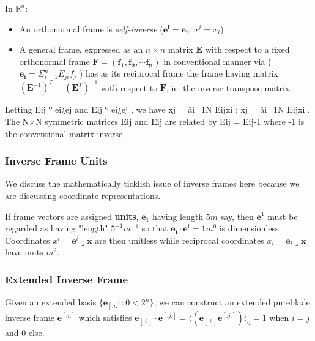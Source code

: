 \documentclass[a4paper]{book}
\numberwithin{equation}{chapter}
\begin{document}
In $\mathbb{R}^n:$ 

\begin{itemize}
    \item An orthonormal frame is \emph{self-inverse} ($\mathbf{e^i=e_i}, \ x^i=x_i$)
    \item A general frame, 
expressed as an $n\times n$ matrix $\mathbf{E}$ with respect to a fixed orthonormal frame $\mathbf{F=(f_1,f_2, \cdots f_n)}$ in conventional manner via ( $\mathbf{e_i} =\Sigma_{i=1}^n E_{ji}f_j$ ) has as its reciprocal frame the frame having matrix $(\mathbf{E}^{-1})^T = (\mathbf{E}^T)^{-1}$ with respect to $\mathbf{F}$, ie. the inverse transpose matrix.
\end{itemize}

 \vspace{\baselineskip}
 
Letting Eij º ei¿ej  and Eij º ei¿ej ,  we have xj = åi=1N Eijxi     ;      xj = åi=1N Eijxi .
The N×N symmetric matrices {Eij} and {Eij} are related by {Eij} = {Eij}-1   where -1 is  the 
conventional matrix inverse. 
    
    \subsubsection{Inverse Frame Units}
    
We discuss the mathematically ticklish issue of inverse frames here because we are discussing coordinate representations.

 \vspace{\baselineskip}

If frame vectors are assigned \textbf{units}, $\mathbf{e}_1$ 
having length $5\si{m}$ say, then $\mathbf{e}^1$ 
must be regarded as having "length" $5^{-1} \si{m}^{-1}$
so that $\mathbf{e_i \cdot e^i} = 1 \si{m}^0$ is dimensionless. 
Coordinates $x^i =\mathbf{e}^i\lrcorner\mathbf{x}$ are then unitless while reciprocal coordinates 
$x_i =\mathbf{e}_i\lrcorner\mathbf{x}$ have units $\si{m}^2$.

    \subsubsection{Extended Inverse Frame}
    
Given an extended basis $\{ \mathbf{e}_{[.i.]} : 0 <2^n \}$, 
we can construct an extended pureblade inverse frame ${\mathbf{e}^{[.i.]}}$
which satisfies $\mathbf{e}_{[.i.]}\cdot \mathbf{e}^{[.j.]}=
\langle (\mathbf{e}_{[.i.]}\mathbf{e}^{[.j.]}) \rangle_0 = 1$ 
when $i=j$ and 0 else. 
    
\end{document}
